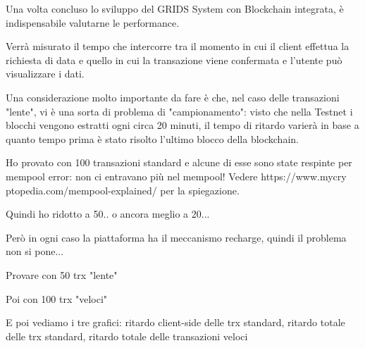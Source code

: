 Una volta concluso lo sviluppo del GRIDS System con Blockchain integrata, è indispensabile valutarne le performance.

Verrà misurato il tempo che intercorre tra il momento in cui il client effettua la richiesta di data e quello in cui la transazione viene confermata e l'utente può visualizzare i dati.

Una considerazione molto importante da fare è che, nel caso delle transazioni "lente", vi è una sorta di problema di "campionamento": visto che nella Testnet i blocchi vengono estratti ogni circa 20 minuti, il tempo di ritardo varierà in base a quanto tempo prima è stato risolto l'ultimo blocco della blockchain.

Ho provato con 100 transazioni standard e alcune di esse sono state respinte per mempool error: non ci entravano più nel mempool! Vedere https://www.mycry ptopedia.com/mempool-explained/ per la spiegazione.

Quindi ho ridotto a 50.. o ancora meglio a 20...

Però in ogni caso la piattaforma ha il meccanismo recharge, quindi il problema non si pone...


Provare con 50 trx "lente"

Poi con 100 trx "veloci"

E poi vediamo i tre grafici: ritardo client-side delle trx standard, ritardo totale delle trx standard, ritardo totale delle transazioni veloci
